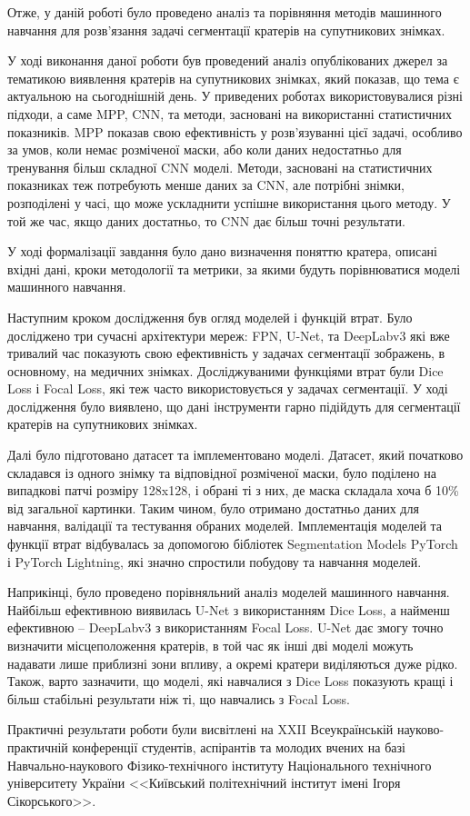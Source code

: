 Отже, у даній роботі було проведено аналіз та порівняння методів
машинного навчання для розв'язання задачі сегментації кратерів
на супутникових знімках.

У ході виконання даної роботи був проведений аналіз опублікованих
джерел за тематикою виявлення кратерів на супутникових
знімках, який показав, що тема є актуальною на сьогоднішній день.
У приведених роботах використовувалися різні підходи, а саме MPP, CNN, та
методи, засновані на використанні статистичних показників.
MPP показав свою ефективність у розв'язуванні цієї задачі, особливо
за умов, коли немає розміченої маски, або коли даних недостатньо для
тренування більш складної CNN моделі. Методи, засновані
на статистичних показниках теж потребують менше даних за CNN,
але потрібні знімки, розподілені у часі, що може ускладнити успішне використання
цього методу.
У той же час, якщо даних достатньо,
то CNN дає більш точні результати.

У ході формалізації завдання було дано визначення поняттю кратера,
описані вхідні дані, кроки методології та метрики, за якими будуть
порівнюватися моделі машинного навчання.

Наступним кроком дослідження був огляд моделей і функцій втрат.
Було досліджено три сучасні архітектури мереж: FPN, U-Net, та DeepLabv3 які вже
тривалий час показують свою ефективність у задачах сегментації зображень,
в основному, на медичних знімках. Досліджуваними функціями втрат були
Dice Loss і Focal Loss, які теж часто використовується у задачах сегментації. У ході
дослідження було виявлено, що дані інструменти гарно підійдуть для
сегментації кратерів на супутникових знімках.

Далі було підготовано датасет та імплементовано моделі. Датасет, який початково
складався із одного знімку та відповідної розміченої маски, було
поділено на випадкові патчі розміру 128x128, і обрані ті з них,
де маска складала хоча б 10\% від загальної картинки.
Таким чином, було отримано достатньо даних для навчання, валідації та
тестування обраних моделей. Імплементація моделей та функції втрат відбувалась за допомогою
бібліотек Segmentation Models PyTorch і PyTorch Lightning, які
значно спростили побудову та навчання моделей.

Наприкінці, було проведено порівняльний аналіз моделей машинного навчання.
Найбільш ефективною виявилась U-Net з використанням Dice Loss,
а найменш ефективною -- DeepLabv3 з використанням Focal Loss.
U-Net дає змогу точно визначити місцеположення кратерів, в той час
як інші дві моделі можуть надавати лише приблизні зони впливу,
а окремі кратери виділяються дуже рідко.
Також, варто зазначити, що моделі, які навчалися з Dice Loss
показують кращі і більш стабільні результати ніж ті,
що навчались з Focal Loss.

Практичні результати роботи були висвітлені на XXII Всеукраїнській
науково-практичній конференції студентів, аспірантів
та молодих вчених на базі Навчально-наукового Фізико-технічного
інституту Національного технічного університету України
<<Київський політехнічний інститут імені Ігоря Сікорського>>.